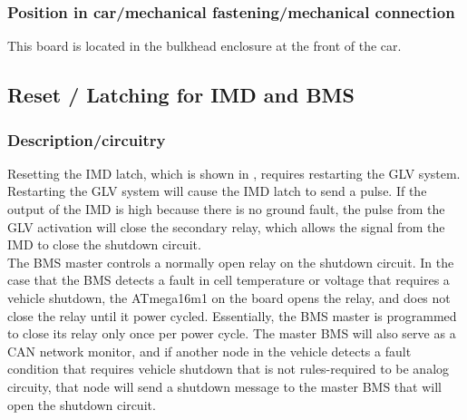\documentclass{article}
\begin{document}
\subsubsection{Position in car/mechanical fastening/mechanical connection}

This board is located in the bulkhead enclosure at the front of the car.

\subsection{Reset / Latching for IMD and BMS}\label{reset_latching_for_imd_and_bms}
\subsubsection{Description/circuitry}

Resetting the IMD latch, which is shown in  , requires restarting the GLV system. Restarting the GLV system will cause the IMD latch to send a pulse. If the output of the IMD is high because there is no ground fault, the pulse from the GLV activation will close the secondary relay, which allows the signal from the IMD to close the shutdown circuit.\\

The BMS master controls a normally open relay on the shutdown circuit. In the case that the BMS detects a fault in cell temperature or voltage that requires a vehicle shutdown, the ATmega16m1 on the board opens the relay, and does not close the relay until it power cycled. Essentially, the BMS master is programmed to close its relay only once per power cycle. The master BMS will also serve as a CAN network monitor, and if another node in the vehicle detects a fault condition that requires vehicle shutdown that is not rules-required to be analog circuity, that node will send a shutdown message to the master BMS that will open the shutdown circuit. 
\end{document}
